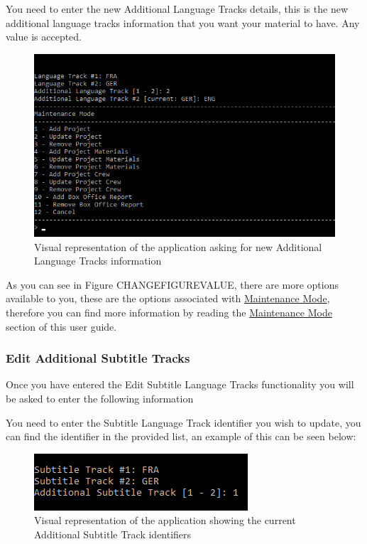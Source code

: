 \documentclass[
  english,
  a4paper,
,tablecaptionabove
]{scrartcl}
\begin{document}
You need to enter the new Additional Language Tracks details, this is
the new additional language tracks information that you want your
material to have. Any value is accepted.

\begin{figure}
\centering
\includegraphics{images/user-guide/maintenance-mode/update-project-material-additional-language-tracks.png}
\caption{Visual representation of the application asking for new
Additional Language Tracks information}
\end{figure}

As you can see in Figure CHANGEFIGUREVALUE, there are more options
available to you, these are the options associated with
\protect\hyperlink{using-maintenance-mode}{Maintenance Mode}, therefore
you can find more information by reading the
\protect\hyperlink{using-maintenance-mode}{Maintenance Mode} section of
this user guide.

\newpage

\hypertarget{edit-additional-subtitle-tracks-1}{%
\subsubsection{Edit Additional Subtitle
Tracks}\label{edit-additional-subtitle-tracks-1}}

Once you have entered the Edit Subtitle Language Tracks functionality
you will be asked to enter the following information

You need to enter the Subtitle Language Track identifier you wish to
update, you can find the identifier in the provided list, an example of
this can be seen below:

\begin{figure}
\centering
\includegraphics{images/user-guide/maintenance-mode/update-project-material-additional-subtitle-track-select-id.png}
\caption{Visual representation of the application showing the current
Additional Subtitle Track identifiers}
\end{figure}
\end{document}
